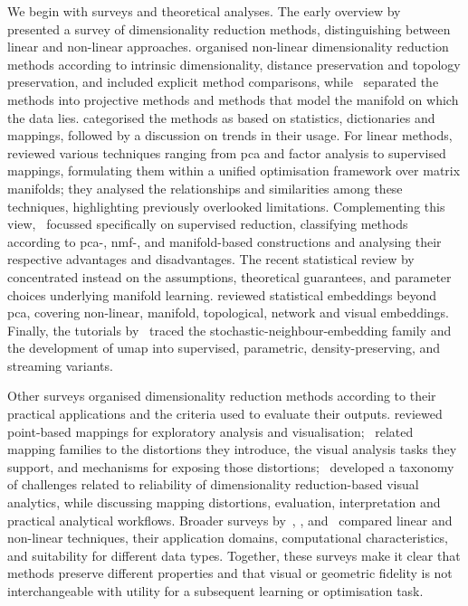 We begin with surveys and theoretical analyses.
The early overview by~\citet{Fodor02} presented a survey of dimensionality reduction methods, distinguishing between linear and non-linear approaches. \citet{LeeVer07} organised non-linear dimensionality reduction methods according to intrinsic dimensionality, distance preservation and topology preservation, and included explicit method comparisons, while~\citet{Burges10b} separated the methods into projective methods and methods that model the manifold on which the data lies. \citet{SorEtAl14} categorised the methods as based on statistics, dictionaries and mappings, followed by a discussion on trends in their usage.
For linear methods,~\citet{CunGha15} reviewed various techniques ranging from \gls{pca} and factor analysis to supervised mappings, formulating them within a unified optimisation framework over matrix manifolds; they analysed the relationships and similarities among these techniques, highlighting previously overlooked limitations.
Complementing this view,~\citet{ChaEtAl19} focussed specifically on supervised reduction, classifying methods according to \gls{pca}-, \gls{nmf}-, and manifold-based constructions and analysing their respective advantages and disadvantages.
The recent statistical review by~\citet{MeiZha24} concentrated instead on the assumptions, theoretical guarantees, and parameter choices underlying manifold learning. \citet{TjEtAl23} reviewed statistical embeddings beyond \gls{pca}, covering non-linear, manifold, topological, network and visual embeddings. Finally, the tutorials by~\citet{GhoEtAl20,GhoEtAl21} traced the stochastic-neighbour-embedding family and the development of \gls{umap} into supervised, parametric, density-preserving, and streaming variants.

Other surveys organised dimensionality reduction methods according to their practical applications and the criteria used to evaluate their outputs.
\citet{EngEtAl11} reviewed point-based mappings for exploratory analysis and visualisation;~\citet{NonAup19} related mapping families to the distortions they introduce, the visual analysis tasks they support, and mechanisms for exposing those distortions;~\citet{JeoEtAl25} developed a taxonomy of challenges related to reliability of dimensionality reduction-based visual analytics, while discussing mapping distortions, evaluation, interpretation and practical analytical workflows.
Broader surveys by~\citet{AyeEtAl20}, \citet{RayEtAl21}, and~\citet{JiaEtAl22} compared linear and non-linear techniques, their application domains, computational characteristics, and suitability for different data types. Together, these surveys make it clear that methods preserve different properties and that visual or geometric fidelity is not interchangeable with utility for a subsequent learning or optimisation task.

